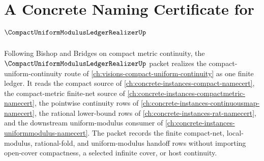 \chapter{A Concrete Naming Certificate for $\CompactUniformModulusLedgerRealizerUp$}
\label{ch:concrete-instances-compact-uniform-modulus-ledger-realizer-namecert}

Following Bishop and Bridges on compact metric continuity, the $\CompactUniformModulusLedgerRealizerUp$ packet realizes the compact-uniform-continuity route of \autoref{ch:visions-compact-uniform-continuity} as one finite ledger. It reads the compact source of \autoref{ch:concrete-instances-compact-namecert}, the compact-metric finite-net source of \autoref{ch:concrete-instances-compactmetric-namecert}, the pointwise continuity rows of \autoref{ch:concrete-instances-continuousmap-namecert}, the rational lower-bound rows of \autoref{ch:concrete-instances-rat-namecert}, and the downstream uniform-modulus consumer of \autoref{ch:concrete-instances-uniformmodulus-namecert}. The packet records the finite compact-net, local-modulus, rational-fold, and uniform-modulus handoff rows without importing open-cover compactness, a selected infinite cover, or host continuity.

